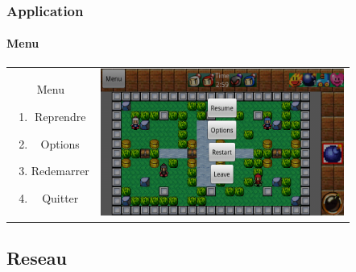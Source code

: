 	\begin{frame}
	\frametitle{Application}
	\framesubtitle{Menu}
	
			\begin{tabular}{cc}
			\begin{minipage}{3cm}
				Menu
				\begin{enumerate}
					\item Reprendre
					\item Options
					\item Redemarrer
					\item Quitter
				\end{enumerate}
			\end{minipage} &
			\begin{minipage}{8cm}
				\includegraphics[width=8cm]{img/menusolo.png} 
			\end{minipage}\\
		\end{tabular}
	
	\end{frame}


\subsection{Reseau}